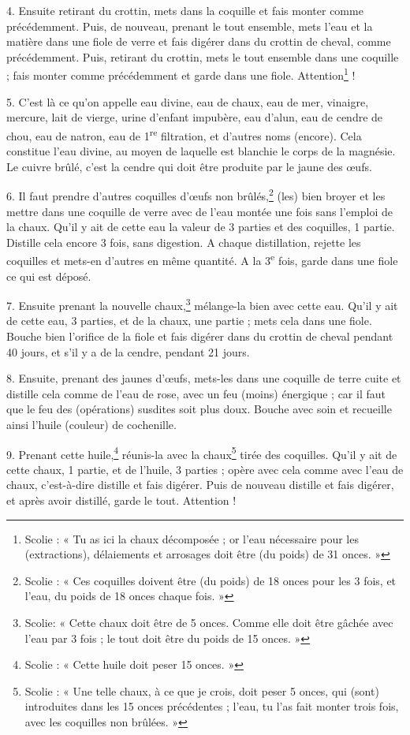 \documentclass[a4paper, 11pt, oneside, polutonikogreek, french]{article}
\begin{document}
4. Ensuite retirant du crottin, mets dans la coquille et fais monter comme précédemment. Puis, de nouveau, prenant le tout ensemble, mets l'eau et la matière dans une fiole de verre et fais digérer dans du crottin de cheval, comme précédemment. Puis, retirant du crottin, mets le tout ensemble dans une coquille ; fais monter comme précédemment et garde dans une fiole. Attention\footnote{Scolie : « Tu as ici la chaux décomposée ; or l'eau nécessaire pour les (extractions), délaiements et arrosages doit être (du poids) de 31 onces. »} !

5. C'est là ce qu'on appelle eau divine, eau de chaux, eau de mer, vinaigre, mercure, lait de vierge, urine d'enfant impubère, eau d'alun, eau de cendre de chou, eau de natron, eau de 1\textsuperscript{re} filtration, et d'autres noms (encore). Cela constitue l'eau divine, au moyen de laquelle est blanchie le corps de la magnésie. Le cuivre brûlé, c'est la cendre qui doit être produite par le jaune des œufs.

6. Il faut prendre d'autres coquilles d'œufs non brûlés,\footnote{Scolie : « Ces coquilles doivent être (du poids) de 18 onces pour les 3 fois, et l'eau, du poids de 18 onces chaque fois. »} (les) bien broyer et les mettre dans une coquille de verre avec de l'eau montée une fois sans l'emploi de la chaux. Qu'il y ait de cette eau la valeur de 3 parties et des coquilles, 1 partie. Distille cela encore 3 fois, sans digestion. A chaque distillation, rejette les coquilles et mets-en d'autres en même quantité. A la 3\textsuperscript{e} fois, garde dans une fiole ce qui est déposé.

7. Ensuite prenant la nouvelle chaux,\footnote{Scolie: « Cette chaux doit être de 5 onces. Comme elle doit être gâchée avec l'eau par 3 fois ; le tout doit être du poids de 15 onces. »} mélange-la bien avec cette eau. Qu'il y ait de cette eau, 3 parties, et de la chaux, une partie ; mets cela dans une fiole. Bouche bien l'orifice de la fiole et fais digérer dans du crottin de cheval pendant 40 jours, et s'il y a de la cendre, pendant 21 jours.

8. Ensuite, prenant des jaunes d'œufs, mets-les dans une coquille de terre cuite et distille cela comme de l'eau de rose, avec un feu (moins) énergique ; car il faut que le feu des (opérations) susdites soit plus doux. Bouche avec soin et recueille ainsi l'huile (couleur) de cochenille.

9. Prenant cette huile,\footnote{Scolie : « Cette huile doit peser 15 onces. »} réunis-la avec la chaux\footnote{Scolie : « Une telle chaux, à ce que je crois, doit peser 5 onces, qui (sont) introduites dans les 15 onces précédentes ; l'eau, tu l'as fait monter trois fois, avec les coquilles non brûlées. »} tirée des coquilles. Qu'il y ait de cette chaux, 1 partie, et de l'huile, 3 parties ; opère avec cela comme avec l'eau de chaux, c'est-à-dire distille et fais digérer. Puis de nouveau distille et fais digérer, et après avoir distillé, garde le tout. Attention !
\end{document}
